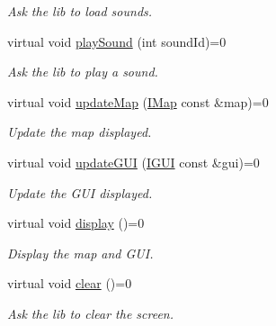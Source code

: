 \begin{DoxyCompactItemize}
\begin{DoxyCompactList}\small\item\em Ask the lib to load sounds. \end{DoxyCompactList}\item 
\mbox{\label{classarcade_1_1IGfxLib_af0aab5b755b9dfed6838bfc370e5c8b3}} 
virtual void \hyperlink{classarcade_1_1IGfxLib_af0aab5b755b9dfed6838bfc370e5c8b3}{play\+Sound} (int sound\+Id)=0
\begin{DoxyCompactList}\small\item\em Ask the lib to play a sound. \end{DoxyCompactList}\item 
\mbox{\label{classarcade_1_1IGfxLib_addc883f69b75e6ec4927027aad94f5b5}} 
virtual void \hyperlink{classarcade_1_1IGfxLib_addc883f69b75e6ec4927027aad94f5b5}{update\+Map} (\hyperlink{classarcade_1_1IMap}{I\+Map} const \&map)=0
\begin{DoxyCompactList}\small\item\em Update the map displayed. \end{DoxyCompactList}\item 
\mbox{\label{classarcade_1_1IGfxLib_a2ad7be45675c5d119293dcd64bdb0274}} 
virtual void \hyperlink{classarcade_1_1IGfxLib_a2ad7be45675c5d119293dcd64bdb0274}{update\+G\+UI} (\hyperlink{classarcade_1_1IGUI}{I\+G\+UI} const \&gui)=0
\begin{DoxyCompactList}\small\item\em Update the G\+UI displayed. \end{DoxyCompactList}\item 
\mbox{\label{classarcade_1_1IGfxLib_a7f280525c718a44c1e05cfe0ba5304c3}} 
virtual void \hyperlink{classarcade_1_1IGfxLib_a7f280525c718a44c1e05cfe0ba5304c3}{display} ()=0
\begin{DoxyCompactList}\small\item\em Display the map and G\+UI. \end{DoxyCompactList}\item 
\mbox{\label{classarcade_1_1IGfxLib_a4116b3d4f503c4a795539b584f77a73d}} 
virtual void \hyperlink{classarcade_1_1IGfxLib_a4116b3d4f503c4a795539b584f77a73d}{clear} ()=0
\begin{DoxyCompactList}\small\item\em Ask the lib to clear the screen. \end{DoxyCompactList}\end{DoxyCompactItemize}


